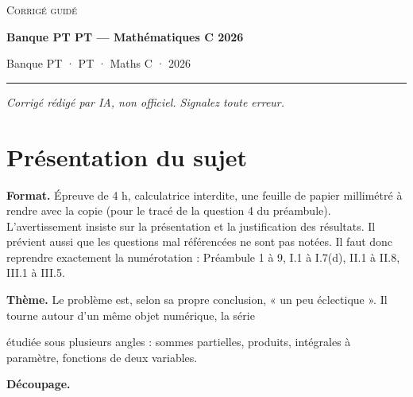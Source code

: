 \documentclass[11pt,a4paper]{article}
\newcommand{\equationajustee}[1]{%
  \sbox{\boiteequation}{$\displaystyle #1$}%
  \ifdim\wd\boiteequation>\linewidth
    \[\resizebox{\linewidth}{!}{\usebox{\boiteequation}}\]%
  \else
    \[#1\]%
  \fi}
\begin{document}
\thispagestyle{plain}
\begin{center}
  {\small\scshape Corrigé guidé}\par\smallskip
  {\LARGE\bfseries Banque PT PT — Mathématiques C 2026\par}\medskip
  {\large Banque PT · PT · Maths C · 2026\par}
\end{center}
\vspace{2pt}\hrule\vspace{8pt}

\emph{Corrigé rédigé par IA, non officiel. Signalez toute erreur.}

\hypertarget{pruxe9sentation-du-sujet}{%
\section{Présentation du sujet}\label{pruxe9sentation-du-sujet}}

\textbf{Format.} Épreuve de 4 h, calculatrice interdite, une feuille de papier millimétré à rendre avec la copie (pour le tracé de la question 4 du préambule). L'avertissement insiste sur la présentation et la justification des résultats. Il prévient aussi que les questions mal référencées ne sont pas notées. Il faut donc reprendre exactement la numérotation : Préambule 1 à 9, I.1 à I.7(d), II.1 à II.8, III.1 à III.5.

\textbf{Thème.} Le problème est, selon sa propre conclusion, « un peu éclectique ». Il tourne autour d'un même objet numérique, la série

\equationajustee{\sum_{n\ge2}u_n,\qquad u_n=\ln\Big(1+\frac{(-1)^n}{n}\Big),}

étudiée sous plusieurs angles : sommes partielles, produits, intégrales à paramètre, fonctions de deux variables.

\textbf{Découpage.}
\end{document}

